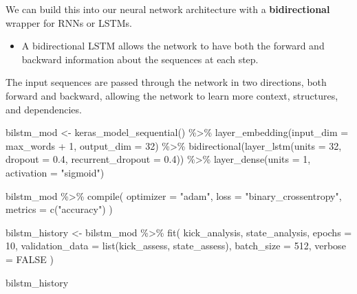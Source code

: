\documentclass[
]{krantz}
\makeatletter
\newenvironment{Shaded}{\begin{snugshade}}{\end{snugshade}}
\newcommand{\AttributeTok}[1]{\textcolor[rgb]{0.77,0.63,0.00}{#1}}
\newcommand{\ConstantTok}[1]{\textcolor[rgb]{0.00,0.00,0.00}{#1}}
\newcommand{\DecValTok}[1]{\textcolor[rgb]{0.00,0.00,0.81}{#1}}
\newcommand{\FloatTok}[1]{\textcolor[rgb]{0.00,0.00,0.81}{#1}}
\newcommand{\FunctionTok}[1]{\textcolor[rgb]{0.00,0.00,0.00}{#1}}
\newcommand{\NormalTok}[1]{#1}
\newcommand{\OtherTok}[1]{\textcolor[rgb]{0.56,0.35,0.01}{#1}}
\newcommand{\SpecialCharTok}[1]{\textcolor[rgb]{0.00,0.00,0.00}{#1}}
\newcommand{\StringTok}[1]{\textcolor[rgb]{0.31,0.60,0.02}{#1}}
\newenvironment{kframe}{%
\medskip{}
\setlength{\fboxsep}{.8em}
 \def\at@end@of@kframe{}%
 \ifinner\ifhmode%
  \def\at@end@of@kframe{\end{minipage}}%
  \begin{minipage}{\columnwidth}%
 \fi\fi%
 \def\FrameCommand##1{\hskip\@totalleftmargin \hskip-\fboxsep
 \colorbox{shadecolor}{##1}\hskip-\fboxsep
     \hskip-\linewidth \hskip-\@totalleftmargin \hskip\columnwidth}%
 \MakeFramed {\advance\hsize-\width
   \@totalleftmargin\z@ \linewidth\hsize
   \@setminipage}}%
 {\par\unskip\endMakeFramed%
 \at@end@of@kframe}
\renewenvironment{Shaded}{\begin{kframe}}{\end{kframe}}
\newenvironment{rmdblock}[1]
  {\begin{shaded*}
  \begin{itemize}[left = -1cm, labelsep = 1cm]
  \renewcommand{\labelitemi}{
    \raisebox{-.7\height}[0pt][0pt]{
      {\setkeys{Gin}{width=3em,keepaspectratio}\texttt{[image: images/\#1]}}
    }
  }
 
  \item
  }
  {
  \end{itemize}
  \end{shaded*}
  }
\newenvironment{rmdnote}
  {\begin{rmdblock}{note}}
  {\end{rmdblock}}
\makeatother
\begin{document}
We can build this into our neural network architecture with a \textbf{bidirectional} wrapper for RNNs or LSTMs.

\begin{rmdnote}
A bidirectional LSTM allows the network to have both the forward and
backward information about the sequences at each step.
\end{rmdnote}

The input sequences are passed through the network in two directions, both forward and backward, allowing the network to learn more context, structures, and dependencies.

\begin{Shaded}
\begin{Highlighting}[]
\NormalTok{bilstm\_mod }\OtherTok{\textless{}{-}} \FunctionTok{keras\_model\_sequential}\NormalTok{() }\SpecialCharTok{\%\textgreater{}\%}
  \FunctionTok{layer\_embedding}\NormalTok{(}\AttributeTok{input\_dim =}\NormalTok{ max\_words }\SpecialCharTok{+} \DecValTok{1}\NormalTok{, }\AttributeTok{output\_dim =} \DecValTok{32}\NormalTok{) }\SpecialCharTok{\%\textgreater{}\%}
  \FunctionTok{bidirectional}\NormalTok{(}\FunctionTok{layer\_lstm}\NormalTok{(}\AttributeTok{units =} \DecValTok{32}\NormalTok{, }\AttributeTok{dropout =} \FloatTok{0.4}\NormalTok{,}
                           \AttributeTok{recurrent\_dropout =} \FloatTok{0.4}\NormalTok{)) }\SpecialCharTok{\%\textgreater{}\%}
  \FunctionTok{layer\_dense}\NormalTok{(}\AttributeTok{units =} \DecValTok{1}\NormalTok{, }\AttributeTok{activation =} \StringTok{"sigmoid"}\NormalTok{)}

\NormalTok{bilstm\_mod }\SpecialCharTok{\%\textgreater{}\%}
  \FunctionTok{compile}\NormalTok{(}
    \AttributeTok{optimizer =} \StringTok{"adam"}\NormalTok{,}
    \AttributeTok{loss =} \StringTok{"binary\_crossentropy"}\NormalTok{,}
    \AttributeTok{metrics =} \FunctionTok{c}\NormalTok{(}\StringTok{"accuracy"}\NormalTok{)}
\NormalTok{  )}

\NormalTok{bilstm\_history }\OtherTok{\textless{}{-}}\NormalTok{ bilstm\_mod }\SpecialCharTok{\%\textgreater{}\%}
  \FunctionTok{fit}\NormalTok{(}
\NormalTok{    kick\_analysis,}
\NormalTok{    state\_analysis,}
    \AttributeTok{epochs =} \DecValTok{10}\NormalTok{,}
    \AttributeTok{validation\_data =} \FunctionTok{list}\NormalTok{(kick\_assess, state\_assess),}
    \AttributeTok{batch\_size =} \DecValTok{512}\NormalTok{,}
    \AttributeTok{verbose =} \ConstantTok{FALSE}
\NormalTok{  )}

\NormalTok{bilstm\_history}
\end{Highlighting}
\end{Shaded}
\end{document}
